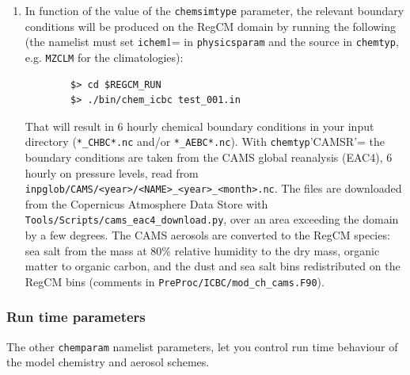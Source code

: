 \begin{enumerate}
    GFAS data in \verb=BIOBURN_EMISSIONS/gfasv1.2= by
        \begin{Verbatim}
        $> ./bin/interp_emissions_bioburn.sh test_001.in
        \end{Verbatim}
    The time axis of the file (monthly, daily or hourly) sets how often the
    fire emissions are updated; they are added to the anthropogenic ones.
    Which scenario to use is controlled by the \verb=scenario= variable in the
    \verb=physicsparam= parameter namelist as above in \ref{physicsparam}
  \item In function of the value of the \verb=chemsimtype= parameter, the
    relevant boundary conditions will be produced on the RegCM domain by
    running the following (the namelist must set \verb=ichem=1= in
    \verb=physicsparam= and the source in \verb=chemtyp=, e.g.
    \verb=MZCLM= for the climatologies):
        \begin{Verbatim}
        $> cd $REGCM_RUN
        $> ./bin/chem_icbc test_001.in
        \end{Verbatim}
    That will result in 6 hourly chemical boundary conditions in your input
    directory (\verb=*_CHBC*.nc= and/or \verb=*_AEBC*.nc=).
    With \verb=chemtyp='CAMSR'= the boundary conditions are taken from the
    CAMS global reanalysis (EAC4), 6 hourly on pressure levels, read from
    \verb=inpglob/CAMS/<year>/<NAME>_<year>_<month>.nc=. The files are
    downloaded from the Copernicus Atmosphere Data Store with
    \verb=Tools/Scripts/cams_eac4_download.py=, over an area exceeding the
    domain by a few degrees. The CAMS aerosols are converted to the RegCM
    species: sea salt from the mass at 80\% relative humidity to the dry
    mass, organic matter to organic carbon, and the dust and sea salt bins
    redistributed on the RegCM bins (comments in
    \verb=PreProc/ICBC/mod_ch_cams.F90=).
\end{enumerate}

\subsubsection{Run time parameters}
The other \verb=chemparam= namelist parameters, let you control run time behaviour
of the model chemistry and aerosol schemes.

